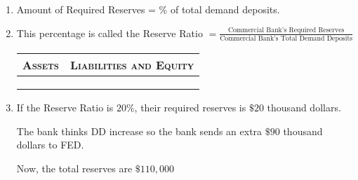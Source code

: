 \begin{enumerate}[label = \textbullet]
		\begin{enumerate}[label = (\alph*)]
			\item Amount of Required Reserves = \% of total demand deposits.

			\item This percentage is called the Reserve Ratio $= \frac{\text{Commercial Bank's Required Reserves}}{\text{Commercial Bank's Total Demand Deposits}}$

		\begin{table}[ht]
			\centering
			\begin{tabular}{r|l}\toprule
				\textsc{Assets}			& \textsc{Liabilities and Equity}	\\ \midrule
										& 									\\ 
										& 									\\ 
										& 									\\ \bottomrule
			\end{tabular}
		\end{table}

			\item If the Reserve Ratio is $20\%$, their required reserves is $\$20$ thousand dollars.

				The bank thinks DD increase so the bank sends an extra $\$90$ thousand dollars to FED.

				Now, the total reserves are $\$110,000$
		\end{enumerate}

\end{enumerate}


